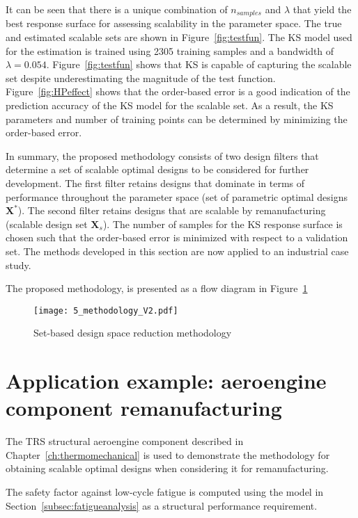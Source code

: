 It can be seen that there is a unique combination of $n_{samples}$ and $\lambda$ that yield the best response surface for assessing scalability in the parameter space. The true and estimated scalable sets are shown in Figure~\ref{fig:testfun}. The \ac{KS} model used for the estimation is trained using 2305 training samples and a bandwidth of $\lambda = 0.054$.
Figure~\ref{fig:testfun} shows that \ac{KS} is capable of capturing the scalable set despite underestimating the magnitude of the test function. Figure~\ref{fig:HPeffect} shows that the order-based error is a good indication of the prediction accuracy of the \ac{KS} model for the scalable set. As a result, the \ac{KS} parameters and number of training points can be determined by minimizing the order-based error.

In summary, the proposed methodology consists of two design filters that determine a set of scalable optimal designs to be considered for further development. The first filter retains designs that dominate in terms of performance throughout the parameter space (set of parametric optimal designs $\mathbf{X}^*$). The second filter retains designs that are scalable by remanufacturing (scalable design set $\mathbf{X}_s$). The number of samples for the \ac{KS} response surface is chosen such that the order-based error is minimized with respect to a validation set. The methods developed in this section are now applied to an industrial case study.

The proposed methodology, is presented as a flow diagram in Figure~\ref{fig:SBDmethods}

\begin{figure}[h]
	\centering
	\texttt{[image: 5\_methodology\_V2.pdf]}
	\caption{ \label{fig:SBDmethods} Set-based design space reduction methodology}
\end{figure}

\section{Application example: aeroengine component remanufacturing} \label{sec:SBDusecase}

The \ac{TRS} structural aeroengine component described in Chapter~\ref{ch:thermomechanical} is used to demonstrate the methodology for obtaining scalable optimal designs when considering it for remanufacturing.

The safety factor against low-cycle fatigue is computed using the model in Section~\ref{subsec:fatigueanalysis} as a structural performance requirement.


